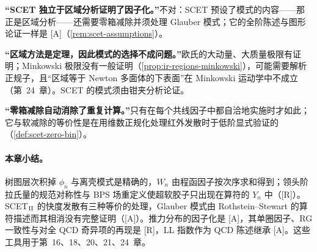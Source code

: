 \begin{tcolorbox}[enhanced,breakable,title=常见误解,fonttitle=\bfseries,
  colback=gray!3!white,colframe=gray!55!black,boxrule=0.6pt,arc=2pt,
  left=5pt,right=5pt,top=3pt,bottom=3pt,before skip=6pt,after skip=6pt]
\textbf{“SCET 独立于区域分析证明了因子化。”}不对：SCET 预设了模式的内容——那正是区域分析——还需要零箱减除并须处理 Glauber 模式；它的全阶陈述与图形论证一样是 [A]（\cref{rem:scet-assumptions}）。\par
\textbf{“区域方法是定理，因此模式的选择不成问题。”}欧氏的大动量、大质量极限有证明\cite{Smirnov:1990rz}；Minkowski 极限没有一般证明（\cref{prop:ir-regions-minkowski}），可能需要解析正规子，且“区域等于 Newton 多面体的下表面”在 Minkowski 运动学中不成立\cite{Gardi:2024axt}（第~24~章）。SCET 的模式须由钳夹分析论证。\par
\textbf{“零箱减除自动消除了重复计算。”}只有在每个共线因子中都自洽地实施时才如此；它与软减除的等价性是在用维数正规化处理红外发散时于低阶显式验证的（\cref{def:scet-zero-bin}）。
\end{tcolorbox}

\paragraph{本章小结。}
树图层次积掉 $\phi_{\bar n}$ 与离壳模式是精确的，$W_n$ 由程函因子按次序求和得到；领头阶拉氏量的规范对称性与 BPS 场重定义使超软胶子只出现在算符的 $Y_n$ 中（[R]）。SCET$_{\rm II}$ 的快度发散有三种等价的处理，Glauber 模式由 Rothstein--Stewart 的算符描述而其相消没有完整证明（[A]）。推力分布的因子化是 [A]，其单圈因子、RG 一致性与对全 QCD 奇异项的再现是 [R]，LL 指数作为 QCD 陈述继承 [A]。这些工具用于第~16、18、20、21、24~章。

